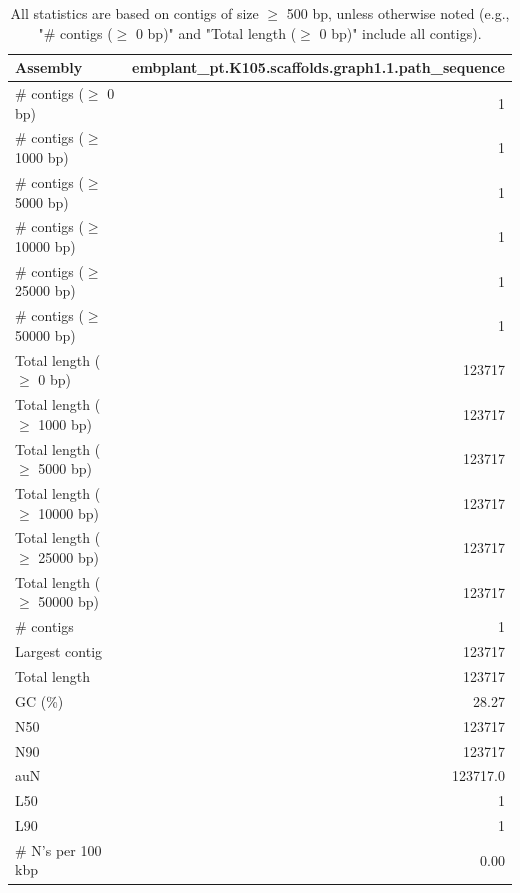 \documentclass[12pt,a4paper]{article}
\begin{document}
\begin{table}[ht]
\begin{center}
\caption{All statistics are based on contigs of size $\geq$ 500 bp, unless otherwise noted (e.g., "\# contigs ($\geq$ 0 bp)" and "Total length ($\geq$ 0 bp)" include all contigs).}
\begin{tabular}{|l*{1}{|r}|}
\hline
Assembly & embplant\_pt.K105.scaffolds.graph1.1.path\_sequence \\ \hline
\# contigs ($\geq$ 0 bp) & 1 \\ \hline
\# contigs ($\geq$ 1000 bp) & 1 \\ \hline
\# contigs ($\geq$ 5000 bp) & 1 \\ \hline
\# contigs ($\geq$ 10000 bp) & 1 \\ \hline
\# contigs ($\geq$ 25000 bp) & 1 \\ \hline
\# contigs ($\geq$ 50000 bp) & 1 \\ \hline
Total length ($\geq$ 0 bp) & 123717 \\ \hline
Total length ($\geq$ 1000 bp) & 123717 \\ \hline
Total length ($\geq$ 5000 bp) & 123717 \\ \hline
Total length ($\geq$ 10000 bp) & 123717 \\ \hline
Total length ($\geq$ 25000 bp) & 123717 \\ \hline
Total length ($\geq$ 50000 bp) & 123717 \\ \hline
\# contigs & 1 \\ \hline
Largest contig & 123717 \\ \hline
Total length & 123717 \\ \hline
GC (\%) & 28.27 \\ \hline
N50 & 123717 \\ \hline
N90 & 123717 \\ \hline
auN & 123717.0 \\ \hline
L50 & 1 \\ \hline
L90 & 1 \\ \hline
\# N's per 100 kbp & 0.00 \\ \hline
\end{tabular}
\end{center}
\end{table}
\end{document}
